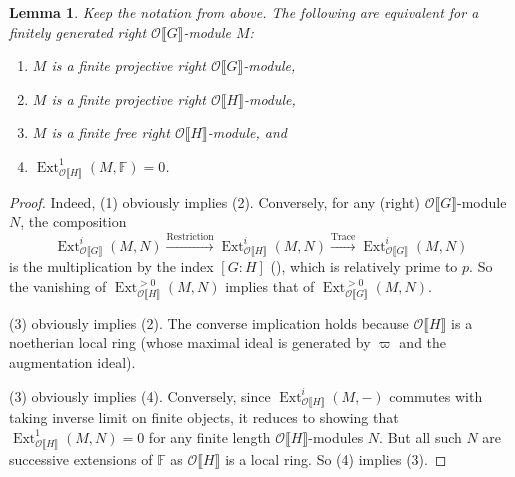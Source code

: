 \documentclass[12pt]{amsart}
\newtheorem{lemma}[subsection]{Lemma}
\theoremstyle{definition}
\numberwithin{equation}{subsection}
\def\calO{\mathcal{O}}
\def\FF{\mathbb{F}}
\DeclareMathOperator{\Ext}{Ext}
\begin{document}
\begin{lemma}
\label{L:Iwasawa algebra properties} Keep the notation from above.
The following are equivalent for a finitely generated  \emph{right} $\calO\llbracket G\rrbracket$-module $M$:
\begin{enumerate}
\item $M$ is a finite projective right $\calO\llbracket G\rrbracket$-module,
\item $M$ is a finite projective right $\calO\llbracket H \rrbracket$-module,
\item $M$ is a finite free right $\calO\llbracket H\rrbracket$-module, and
\item $\Ext^1_{\calO\llbracket H\rrbracket}(M, \FF) = 0$.
\end{enumerate}
\end{lemma}
\begin{proof}


Indeed, (1) obviously implies (2). Conversely, for any (right) $\calO\llbracket G\rrbracket$-module $N$, the composition
\[
\Ext^i_{\calO\llbracket G\rrbracket}(M, N) \xrightarrow{\mathrm{Restriction}}
\Ext^i_{\calO\llbracket H\rrbracket}(M, N)
\xrightarrow{\mathrm{Trace}}
\Ext^i_{\calO\llbracket G\rrbracket}(M, N)
\]
is the multiplication by the index $[G:H]$ (\cite[Chapter I, \S~2.4]{Serre-Galois cohomology}), which is relatively prime to $p$. So the vanishing of $\Ext^{>0}_{\calO\llbracket H\rrbracket}(M, N)$ implies that of $\Ext^{>0}_{\calO\llbracket G\rrbracket}(M, N)$.

(3) obviously implies (2). The converse implication holds because $\calO\llbracket H\rrbracket$ is a noetherian local ring (whose maximal ideal is generated by $\varpi$ and the augmentation ideal).

(3) obviously implies (4). Conversely, since $\Ext^i_{\calO\llbracket H\rrbracket}(M,-)$ commutes with taking inverse limit on finite objects, it reduces to showing that $\Ext^1_{\calO\llbracket H\rrbracket}(M, N) =0$ for any finite length $\calO\llbracket H\rrbracket$-modules $N$. But all such $N$ are successive extensions of $\FF$ as $\calO\llbracket H\rrbracket$ is a local ring. So (4) implies (3). 
\end{proof}
\end{document}
